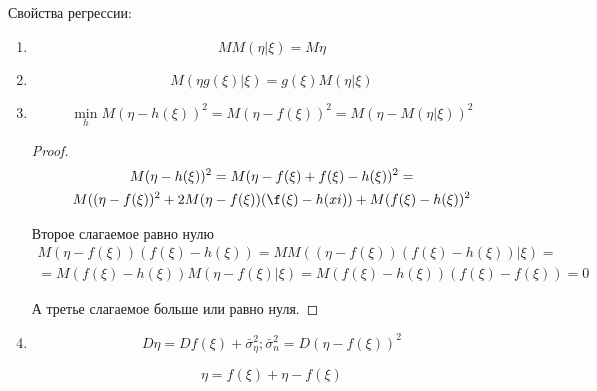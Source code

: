 Свойства регрессии:
\begin{enumerate}
  \item
    \[
      M M(\eta | \xi) = M \eta
    \]
  \item
    \[
      M (\eta g(\xi) | \xi) = g(\xi) M(\eta | \xi)
    \]
  \item
    \[
      \min_{h} M(\eta - h(\xi))^2 = M (\eta - f(\xi))^2 = M (\eta - M(\eta | \xi))^2
    \]
    \begin{proof}
      \begin{multline*}
        M(\eta - h(\xi))^2 = M( \eta - f(\xi) + f(\xi) - h(\xi) )^2 = \\
        M( (\eta - f(\xi))^2 + 2 M(\eta - f(\xi))(\f(\xi) - h(xi)) + M (f(\xi) - h(\xi))^2 
      \end{multline*}

      Второе слагаемое равно нулю
      \begin{multline*}
        M(\eta - f(\xi))(f(\xi) - h(\xi)) = M M( (\eta - f(\xi))(f(\xi) - h(\xi)) |\xi ) = \\
        = M( f(\xi) - h(\xi) ) M(\eta - f(\xi) | \xi) 
        = M( f(\xi) - h(\xi) ) (f(\xi) - f(\xi)) = 0
      \end{multline*}

      А третье слагаемое больше или равно нуля.
    \end{proof}

  \item
    \[
      D \eta = D f(\xi) + \bar \sigma_\eta^2; \bar \sigma_n^2 = D(\eta - f(\xi))^2
    \]

    \[
      \eta = f(\xi) + \eta - f(\xi)
    \]
\end{enumerate}
